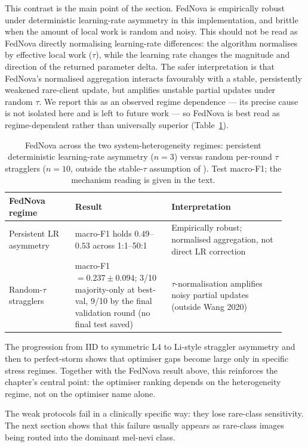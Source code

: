 \documentclass[11pt,a4paper]{report}
\begin{document}
This contrast is the main point of the section. FedNova is empirically robust
under deterministic learning-rate asymmetry in this implementation, and brittle
when the amount of local work is random and noisy. This should not be read as
FedNova directly normalising learning-rate differences: the algorithm normalises
by effective local work ($\tau$), while the learning rate changes the magnitude
and direction of the returned parameter delta. The safer interpretation is that
FedNova's normalised aggregation interacts favourably with a stable, persistently
weakened rare-client update, but amplifies unstable partial updates under random
$\tau$. We report this as an observed regime dependence --- its precise cause is
not isolated here and is left to future work --- so FedNova is best read as
regime-dependent rather than universally superior (Table~\ref{tab:fednova-regime}).

\begin{table}[H]
\centering
\small
\caption{FedNova across the two system-heterogeneity regimes: persistent
deterministic learning-rate asymmetry ($n=3$) versus random per-round $\tau$
stragglers ($n=10$, outside the stable-$\tau$ assumption of
\citet{wang2020fednova}). Test macro-F1; the mechanism reading is given in the
text.}
\label{tab:fednova-regime}
\begin{tabular}{p{0.22\linewidth}p{0.32\linewidth}p{0.38\linewidth}}
\toprule
FedNova regime & Result & Interpretation \\
\midrule
Persistent LR asymmetry & macro-F1 holds $0.49$--$0.53$ across 1:1--50:1 & Empirically robust; normalised aggregation, not direct LR correction \\
Random-$\tau$ stragglers & macro-F1 $= 0.237 \pm 0.094$; 3/10 majority-only at best-val, 9/10 by the final validation round (no final test saved) & $\tau$-normalisation amplifies noisy partial updates (outside Wang 2020) \\
\bottomrule
\end{tabular}
\end{table}

The progression from IID to
symmetric L4 to Li-style straggler asymmetry and then to perfect-storm shows
that optimiser gaps become large only in specific stress regimes. Together
with the FedNova result above, this reinforces the chapter's central point:
the optimiser ranking depends on the heterogeneity regime, not on the
optimiser name alone.


The weak protocols fail in a clinically specific way: they lose rare-class
sensitivity. The next section shows that this failure usually appears as
rare-class images being routed into the dominant mel-nevi class.
\end{document}
